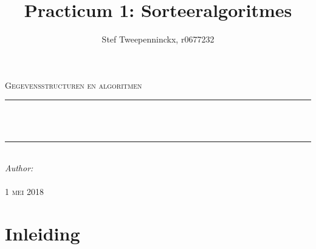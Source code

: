 \documentclass[11pt, a4paper]{article}
\author{Stef Tweepenninckx, r0677232}
\title{Practicum 1: Sorteeralgoritmes}
\makeatletter
\def\printtitle{                 
    {\large \@title}}
\def\printauthor{                  
    {\large \@author}}
\makeatother
\begin{document}
\begin{titlepage}
\newcommand{\HRule}{\rule{\linewidth}{0.5mm}} 
\center 
\textsc{\LARGE Gegevensstructuren en algoritmen}\\[1.5cm] 
\HRule \\[0.4cm]

{\huge \bfseries \printtitle}\\[0.4cm] 
\HRule \\[0.4cm]

\Large \emph{Author:}\\
 \textsc{\printauthor}\\[3cm]

{\large \textsc{1 mei 2018}}\\[3cm] 

\vfill 
\end{titlepage}

\section*{Inleiding}
\end{document}
